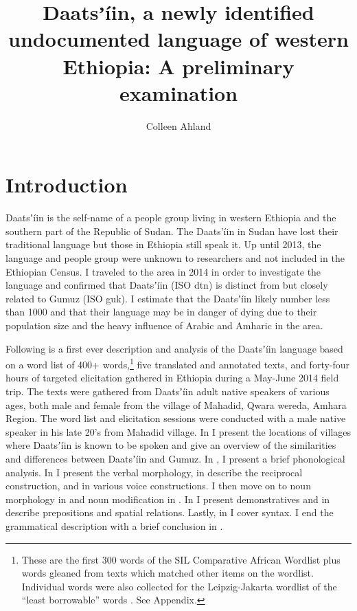 \documentclass[output=paper]{langsci/langscibook}
\title{Daatsʼíin, a newly identified undocumented language of western Ethiopia: A preliminary examination}
\author{%
 Colleen Ahland \affiliation{SIL International} 
}
\begin{document}

\section{Introduction}\label{sec:ahlandc:1}

Daatsʼíin is the self-name of a people group living in western Ethiopia and the southern part of the Republic of Sudan. The Daats’íin in Sudan have lost their traditional language but those in Ethiopia still speak it. Up until 2013, the language and people group were unknown to researchers and not included in the Ethiopian Census. I traveled to the area in 2014 in order to investigate the language and confirmed that Daatsʼíin (ISO dtn) is distinct from but closely related to Gumuz (ISO guk). I estimate that the Daatsʼíin likely number less than 1000 and that their language may be in danger of dying due to their population size and the heavy influence of Arabic and Amharic in the area.

Following is a first ever description and analysis of the Daatsʼíin language based on a word list of 400+ words,\footnote{These are the first 300 words of the SIL Comparative African Wordlist \citep{SniderRoberts2006} plus words gleaned from texts which matched other items on the wordlist. Individual words were also collected for the Leipzig-Jakarta wordlist of the “least borrowable” words \citep{HaspelmathTadmor2009}. See Appendix.} five translated and annotated texts, and forty-four hours of targeted elicitation gathered in Ethiopia during a May-June 2014 field trip. The texts were gathered from Daatsʼíin adult native speakers of various ages, both male and female from the village of Mahadid, Qwara wereda, Amhara Region. The word list and elicitation sessions were conducted with a male native speaker in his late 20’s from Mahadid village. In  I present the locations of villages where Daatsʼíin is known to be spoken and give an overview of the similarities and differences between Daatsʼíin and Gumuz. In , I present a brief phonological analysis. In  I present the verbal morphology, in  describe the reciprocal construction, and in  various voice constructions. I then move on to noun morphology in  and noun modification in . In  I present demonstratives and in  describe prepositions and spatial relations. Lastly, in  I cover syntax. I end the grammatical description with a brief conclusion in .
\end{document}
